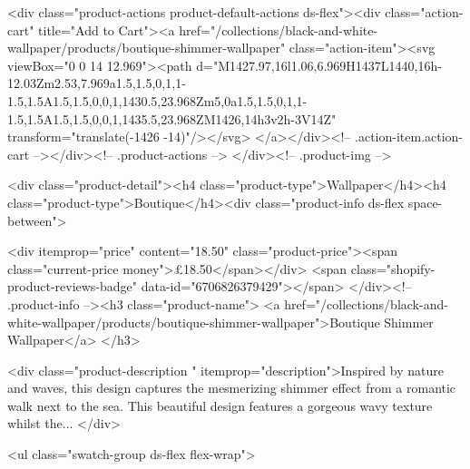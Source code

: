 {{{{{{{<div class="product-actions product-default-actions ds-flex"><div class="action-cart" title="Add to Cart"><a href="/collections/black-and-white-wallpaper/products/boutique-shimmer-wallpaper" class="action-item"><svg viewBox="0 0 14 12.969"><path d="M1427.97,16l1.06,6.969H1437L1440,16h-12.03Zm2.53,7.969a1.5,1.5,0,1,1-1.5,1.5A1.5,1.5,0,0,1,1430.5,23.968Zm5,0a1.5,1.5,0,1,1-1.5,1.5A1.5,1.5,0,0,1,1435.5,23.968ZM1426,14h3v2h-3V14Z" transform="translate(-1426 -14)"/></svg>
</a></div><!-- .action-item.action-cart --></div><!-- .product-actions -->
</div><!-- .product-img -->

<div class="product-detail"><h4 class="product-type">Wallpaper</h4><h4 class="product-type">Boutique</h4><div class="product-info ds-flex space-between">
    
<div itemprop="price" content="18.50" class="product-price"><span class="current-price money">£18.50</span></div>
    <span class="shopify-product-reviews-badge" data-id="6706826379429"></span>
  </div><!-- .product-info --><h3 class="product-name">
      <a href="/collections/black-and-white-wallpaper/products/boutique-shimmer-wallpaper">Boutique Shimmer Wallpaper</a>
    </h3>
    
<div class="product-description " itemprop="description">Inspired by nature and waves, this design captures the mesmerizing shimmer effect from a romantic walk next to the sea. This beautiful design features a gorgeous wavy texture whilst the...
</div>



<ul class="swatch-group ds-flex flex-wrap">
        
}}}}}}}
